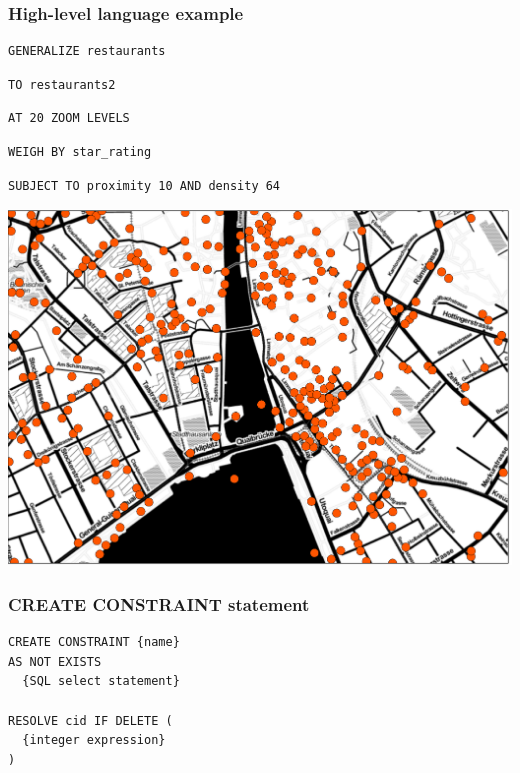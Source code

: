 \documentclass{beamer}
\begin{document}
\begin{frame}[fragile,t]
  \frametitle{High-level language example}
  \begin{description}[<+->]
  \item
  \begin{lstlisting}
GENERALIZE restaurants 
\end{lstlisting}
  \item
\begin{lstlisting}
TO restaurants2
\end{lstlisting}
  \item
\begin{lstlisting}
AT 20 ZOOM LEVELS
\end{lstlisting}
  \item
\begin{lstlisting}
WEIGH BY star_rating
\end{lstlisting}
  \item
\begin{lstlisting}    
SUBJECT TO proximity 10 AND density 64
\end{lstlisting}
  \item
    \begin{center}
  	\includegraphics[scale=0.15]{figs/zoom16.pdf}
  \end{center}
  \end{description}
\end{frame}

\begin{frame}[fragile]
\frametitle{CREATE CONSTRAINT statement}
\begin{lstlisting}
CREATE CONSTRAINT {name}
AS NOT EXISTS
  {SQL select statement}
  
RESOLVE cid IF DELETE (
  {integer expression}
)
\end{lstlisting}
\end{frame}
\end{document}
